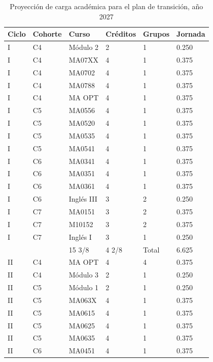 \begin{longtable}[c]{|l|l|l|l|l|l|}
\caption{Proyección de carga académica para el plan de transición, año 2027}
\label{tab:carga2027}\\
\hline
\rowcolor[HTML]{00C0F3}
Ciclo & Cohorte & Curso & Créditos & Grupos & Jornada \\ \hline
\endhead
%
I & C4 & Módulo 2 & 2 & 1 & 0.250 \\ \hline
I & C4 & MA07XX & 4 & 1 & 0.375 \\ \hline
I & C4 & MA0702 & 4 & 1 & 0.375 \\ \hline
I & C4 & MA0788 & 4 & 1 & 0.375 \\ \hline
I & C4 & MA OPT & 4 & 1 & 0.375 \\ \hline
I & C5 & MA0556 & 4 & 1 & 0.375 \\ \hline
I & C5 & MA0520 & 4 & 1 & 0.375 \\ \hline
I & C5 & MA0535 & 4 & 1 & 0.375 \\ \hline
I & C5 & MA0541 & 4 & 1 & 0.375 \\ \hline
I & C6 & MA0341 & 4 & 1 & 0.375 \\ \hline
I & C6 & MA0351 & 4 & 1 & 0.375 \\ \hline
I & C6 & MA0361 & 4 & 1 & 0.375 \\ \hline
I & C6 & Inglés III & 3 & 2 & 0.250 \\ \hline
I & C7 & MA0151 & 3 & 2 & 0.375 \\ \hline
I & C7 & M10152 & 3 & 2 & 0.375 \\ \hline
I & C7 & Inglés I & 3 & 1 & 0.250 \\ \hline
 &  & 15 3/8 & 4 2/8 & Total & 6.625 \\ \hline
II & C4 & MA OPT & 4 & 4 & 0.375 \\ \hline
II & C4 & Módulo 3 & 2 & 1 & 0.250 \\ \hline
II & C5 & Módulo 1 & 2 & 1 & 0.250 \\ \hline
II & C5 & MA063X & 4 & 1 & 0.375 \\ \hline
II & C5 & MA0615 & 4 & 1 & 0.375 \\ \hline
II & C5 & MA0625 & 4 & 1 & 0.375 \\ \hline
II & C5 & MA0635 & 4 & 1 & 0.375 \\ \hline
II & C6 & MA0451 & 4 & 1 & 0.375 \\ \hline

\end{longtable}

